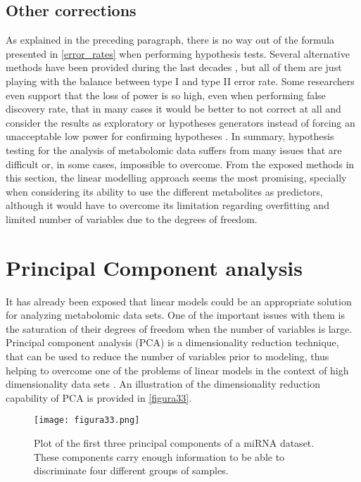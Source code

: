 \subsection{Other corrections}
As explained in the preceding paragraph, there is no way out of the formula presented in \autoref{error_rates} when performing hypothesis tests. Several alternative methods have been provided during the last decades \parencite{benjamini2001control, gao2008multiple, castro2015adjusted}, but all of them are just playing with the balance between type I and type II error rate. Some researchers even support that the loss of power is so high, even when performing false discovery rate, that in many cases it would be better to not correct at all and consider the results as exploratory or hypotheses generators instead of forcing an unacceptable low power for confirming hypotheses \parencite{bender2001adjusting}.
In summary, hypothesis testing for the analysis of metabolomic data suffers from many issues that are difficult or, in some cases, impossible to overcome. From the exposed methods in this section, the linear modelling approach seems the most promising, specially when considering its ability to use the different metabolites as predictors, although it would have to overcome its limitation regarding overfitting and limited number of variables due to the degrees of freedom. 

\section{Principal Component analysis}
\label{sec:PCA}
It has already been exposed that linear models could be an appropriate solution for analyzing metabolomic data sets. One of the important issues with them is the saturation of their degrees of freedom when the number of variables is large. Principal component analysis (PCA) is a dimensionality reduction technique, that can be used to reduce the number of variables prior to modeling, thus helping to overcome one of the problems of linear models in the context of high dimensionality data sets \parencite{wang2008principal}. An illustration of the dimensionality reduction capability of PCA is provided in \autoref{figura33}.


\begin{figure}[hbtp]
	\centering
\texttt{[image: figura33.png]}
\caption{Plot of the first three principal components of a miRNA dataset. These components carry enough information to be able to discriminate four different groups of samples.}
\label{figura33}
\end{figure}

